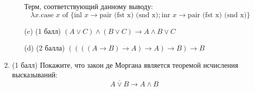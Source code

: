 \begin{enumerate}
\begin{itemize}
\begin{solution}
\begin{prooftree}
      \end{prooftree}
      Терм, соответствующий данному выводу:
      \begin{equation}
        \lambda x. \text{case } x \text{ of } \{\text{inl } x \rightarrow \text{pair (fst x) (snd x)}; \text{inr } x \rightarrow \text{pair (fst x) (snd x)}\}
      \end{equation}
    \end{solution}
    \item[(c)] (1 балл) $(A \lor C) \land (B \lor C) \rightarrow A \land B \lor C$
    \item[(d)] (2 балла) $((((A \rightarrow B) \rightarrow A) \rightarrow A) \rightarrow B) \rightarrow B$
  \end{itemize}
  \item (1 балл) Покажите, что закон де Моргана является теоремой исчисления высказываний:
  $$\overline{A \lor B} \rightarrow A \land B$$
\end{enumerate}
\clearpage
